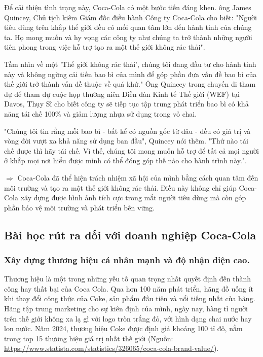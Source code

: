 \documentclass{article}
\begin{document}
    \vspace{0.2cm}
    Để cải thiện tình trạng này, Coca-Cola có một bước tiến đáng khen. ông James Quincey, Chủ tịch kiêm Giám đốc điều hành Công ty Coca-Cola cho biết: "Người tiêu dùng trên khắp thế giới đều có mối quan tâm lớn đến hành tinh của chúng ta. Họ mong muốn và hy vọng các công ty như chúng ta trở thành những người tiên phong trong việc hỗ trợ tạo ra một thế giới không rác thải".

    \vspace{0.2cm}
    Tầm nhìn về một 'Thế giới không rác thải', chúng tôi đang đầu tư cho hành tinh này và không ngừng cải tiến bao bì của mình để góp phần đưa vấn đề bao bì của thế giới trở thành vấn đề thuộc về quá khứ." Ông Quincey trong chuyến đi tham dự  để tham dự cuộc họp thường niên Diễn đàn Kinh tế Thế giới (WEF) tại Davos, Thụy Sĩ cho biết công ty sẽ tiếp tục tập trung phát triển bao bì có khả năng tái chế 100\% và giảm lượng nhựa sử dụng trong vỏ chai.

    \vspace{0.2cm}
    "Chúng tôi tin rằng mỗi bao bì - bất kể có nguồn gốc từ đâu - đều có giá trị và vòng đời vượt xa khả năng sử dụng ban đầu", Quincey nói thêm. "Thứ nào tái chế được thì hãy tái chế. Vì thế, chúng tôi mong muốn hỗ trợ để tất cả mọi người ở khắp mọi nơi hiểu được mình có thể đóng góp thế nào cho hành trình này.".

    \vspace{0.2cm}
    $\Rightarrow$ Coca-Cola đã thể hiện trách nhiệm xã hội của mình bằng cách quan tâm đến môi trường và tạo ra một thế giới không rác thải. Điều này không chỉ giúp Coca-Cola xây dựng được hình ảnh tích cực trong mắt người tiêu dùng mà còn góp phần bảo vệ môi trường và phát triển bền vững.

\subsection{Bài học rút ra đối với doanh nghiệp Coca-Cola}
    \subsubsection{Xây dựng thương hiệu cá nhân mạnh và độ nhận diện cao.}
    
    \vspace{0.2cm}
    Thương hiệu là một trong những yếu tố quan trọng nhất quyết định đến thành công hay thất bại của Coca Cola. Qua hơn 100 năm phát triển, hãng đồ uống ít khi thay đổi công thức của Coke, sản phẩm đầu tiên và nổi tiếng nhất của hãng. Hãng tập trung marketing cho sự kiên định của mình, ngày nay, hàng tỉ người trên thế giới không xa lạ gì với logo tròn trắng đỏ, với hình dạng chai nước hay lon nước. Năm 2024, thương hiệu Coke được định giá khoảng 100 tỉ đô, nằm trong top 15 thương hiệu giá trị nhất thế giới (Nguồn: \href{https://www.statista.com/statistics/326065/coca-cola-brand-value/}{https://www.statista.com/statistics/326065/coca-cola-brand-value/}).
\end{document}
